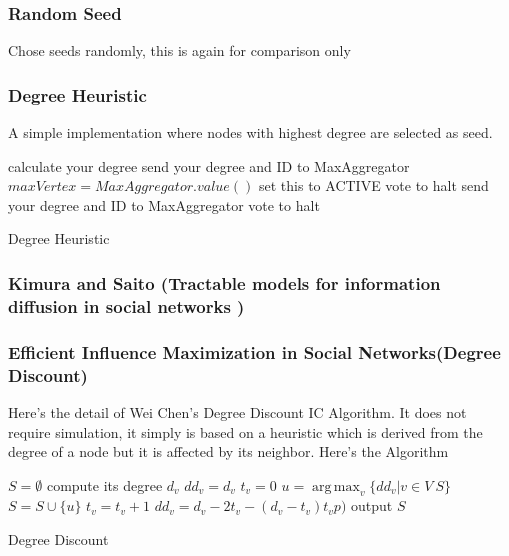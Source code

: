 \documentclass[english]{tktltiki}
\DeclareMathOperator*{\argmax}{arg\,max}
\begin{document}
\subsubsection{Random Seed}
Chose seeds randomly, this is again for comparison only

\subsubsection{Degree Heuristic}
A simple implementation where nodes with highest degree are selected as seed.
\begin{algorithm}[ht!]
\begin{algorithmic}
	\State calculate your degree
	\State send your degree and ID to MaxAggregator
	\State $maxVertex=MaxAggregator.value()$
		\State set this to ACTIVE
		\State vote to halt
	\Else
		\State send your degree and ID to MaxAggregator
	\EndIf
\Else
	\State vote to halt
\EndIf
\end{algorithmic}
\caption{Degree Heuristic}
\end{algorithm}

\subsubsection{Kimura and Saito (Tractable models for information diffusion in social networks )}

\subsubsection{Efficient Influence Maximization in Social Networks(Degree Discount)}
Here's the detail of Wei Chen's Degree Discount IC Algorithm. It does not require simulation, it simply is based on a heuristic which is derived from the degree of a node but it is affected by its neighbor. 
Here's the Algorithm \newline
\begin{algorithm}[ht!]
\begin{algorithmic}
\State $S=\emptyset$
	\State compute its degree $d_v$
 	\State $dd_v=d_v$
 	\State $t_v = 0$
\EndFor
{}
	\State $u = \argmax_v \{dd_v |  v \in V \ S\}$
	\State $S = S \cup \{u\}$
		\State $t_v = t_v + 1$
		\State $dd_v = d_v - 2t_v - (d_v - t_v)t_v p)$
	\EndFor
\EndFor
\State output $S$
\end{algorithmic}
\caption{Degree Discount}
\end{algorithm}
\end{document}
